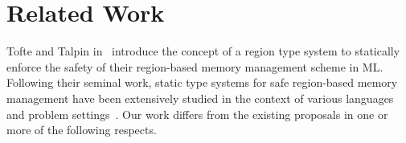 \section{Related Work}
\label{sec:related-work}


Tofte and Talpin in~\cite{tofte93,tofte94,tofte97} introduce the
concept of a region type system to statically enforce the safety of
their region-based memory management scheme in ML. Following their
seminal work, static type systems for safe region-based memory
management have been extensively studied in the context of various
languages and problem settings~\cite{cyclone02,cyclone04,yates99,MIT03,DPJ09,HMN01,WW01,rust,gpu14}.
Our work differs from the
existing proposals in one or more of the following respects.

